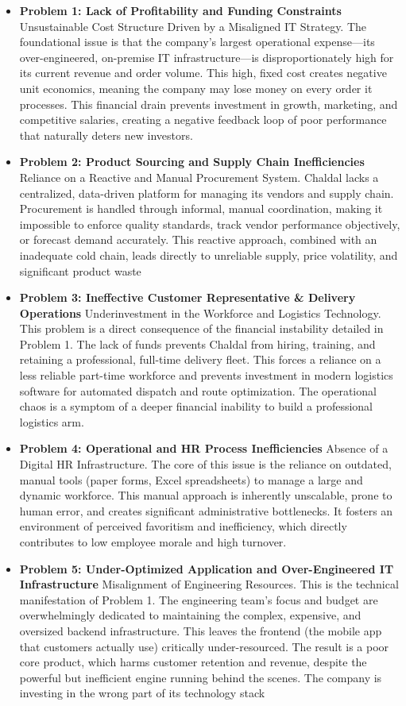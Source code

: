 \documentclass[12pt,a4paper]{article}
\begin{document}
\begin{itemize} 
    \item \textbf{Problem 1: Lack of Profitability and Funding Constraints} Unsustainable Cost Structure Driven by a Misaligned IT Strategy. The foundational issue is that the company's largest operational expense—its over-engineered, on-premise IT infrastructure—is disproportionately high for its current revenue and order volume. This high, fixed cost creates negative unit economics, meaning the company may lose money on every order it processes. This financial drain prevents investment in growth, marketing, and competitive salaries, creating a negative feedback loop of poor performance that naturally deters new investors.
    \item \textbf{Problem 2: Product Sourcing and Supply Chain Inefficiencies} Reliance on a Reactive and Manual Procurement System. Chaldal lacks a centralized, data-driven platform for managing its vendors and supply chain. Procurement is handled through informal, manual coordination, making it impossible to enforce quality standards, track vendor performance objectively, or forecast demand accurately. This reactive approach, combined with an inadequate cold chain, leads directly to unreliable supply, price volatility, and significant product waste
    \item \textbf{Problem 3: Ineffective Customer Representative \& Delivery Operations} Underinvestment in the Workforce and Logistics Technology. This problem is a direct consequence of the financial instability detailed in Problem 1. The lack of funds prevents Chaldal from hiring, training, and retaining a professional, full-time delivery fleet. This forces a reliance on a less reliable part-time workforce and prevents investment in modern logistics software for automated dispatch and route optimization. The operational chaos is a symptom of a deeper financial inability to build a professional logistics arm.
    \item \textbf{Problem 4: Operational and HR Process Inefficiencies} Absence of a Digital HR Infrastructure. The core of this issue is the reliance on outdated, manual tools (paper forms, Excel spreadsheets) to manage a large and dynamic workforce. This manual approach is inherently unscalable, prone to human error, and creates significant administrative bottlenecks. It fosters an environment of perceived favoritism and inefficiency, which directly contributes to low employee morale and high turnover.
    \item \textbf{Problem 5: Under-Optimized Application and Over-Engineered IT Infrastructure} Misalignment of Engineering Resources. This is the technical manifestation of Problem 1. The engineering team's focus and budget are overwhelmingly dedicated to maintaining the complex, expensive, and oversized backend infrastructure. This leaves the frontend (the mobile app that customers actually use) critically under-resourced. The result is a poor core product, which harms customer retention and revenue, despite the powerful but inefficient engine running behind the scenes. The company is investing in the wrong part of its technology stack
\end{itemize}
\end{document}
